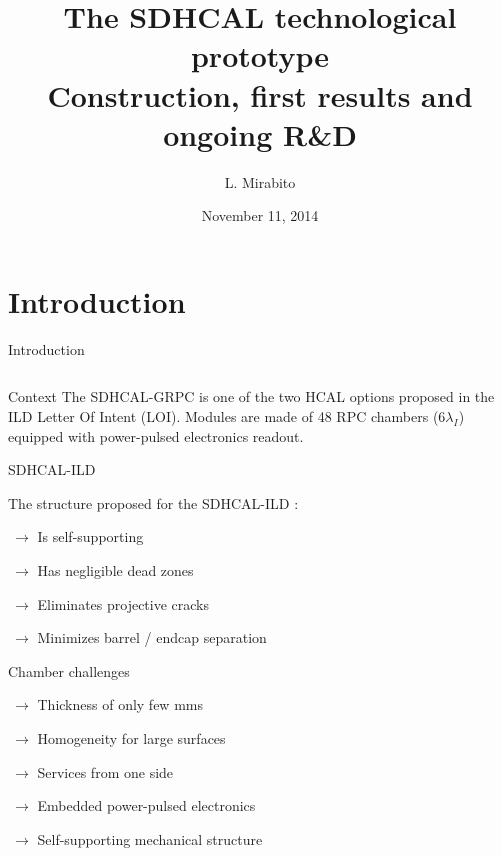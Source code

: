 \documentclass[10pt]{beamer}
\title[The SDHCAL technological proposal]{The SDHCAL technological prototype \\ Construction, first results and ongoing R\&D}
\author{L. Mirabito}
\institute{IPN Lyon, UCB Lyon, IN2P3, CNRS}
\date{November 11, 2014}
\begin{document}


\begin{frame}
  \titlepage
\end{frame}

\section{Introduction}
\begin{frame}[shrink=5]{Introduction}


  \begin{columns}
    \begin{column}{0.6\textwidth}
      \begin{block}{\small Context}
   	{\small The SDHCAL-GRPC is one of the two HCAL options proposed
          in the ILD Letter Of Intent (LOI). Modules are  made of 
          48 RPC chambers (6$\lambda_I$) equipped with 
          power-pulsed electronics readout.}   
      \end{block}
      
      \begin{block}{ \small SDHCAL-ILD}
        {\small The structure proposed for the SDHCAL-ILD :
          \par $ ~ \rightarrow$ Is self-supporting 
          \par $ ~\rightarrow$ Has negligible dead zones 
          \par $ ~ \rightarrow$ Eliminates projective cracks 
          \par $ ~ \rightarrow$ Minimizes barrel / endcap separation 
        }
      \end{block}

      \begin{block}{\small  Chamber challenges}
        {\small 
          \par $ ~ \rightarrow$ Thickness of only few mms
          \par $ ~ \rightarrow$ Homogeneity for large surfaces
          \par $ ~ \rightarrow$ Services from one side
          \par $ ~ \rightarrow$ Embedded power-pulsed electronics
          \par $ ~ \rightarrow$ Self-supporting mechanical structure 
          
}
\end{block}
\end{column}
\end{columns}
\end{frame}
\end{document}
